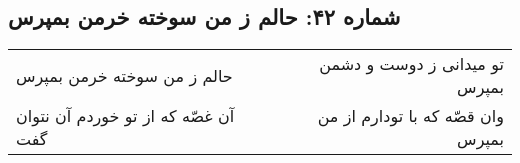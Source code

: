 \begin{center}
\section*{شماره ۴۲: حالم ز من سوخته خرمن بمپرس}
\label{sec:042}
\begin{longtable}{l p{0.5cm} r}
حالم ز من سوخته خرمن بمپرس
&&
تو میدانی ز دوست و دشمن بمپرس
\\
آن غصّه که از تو خوردم آن نتوان گفت
&&
وان قصّه که با تودارم از من بمپرس
\\
\end{longtable}
\end{center}
